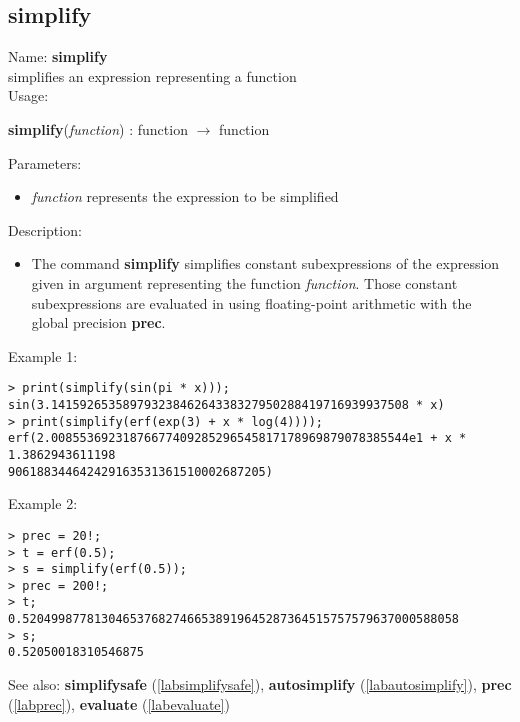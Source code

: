 \subsection{simplify}
\label{labsimplify}
\noindent Name: \textbf{simplify}\\
simplifies an expression representing a function\\
\noindent Usage: 
\begin{center}
\textbf{simplify}(\emph{function}) : \textsf{function} $\rightarrow$ \textsf{function}
\end{center}
Parameters: 
\begin{itemize}
\item \emph{function} represents the expression to be simplified
\end{itemize}
\noindent Description: \begin{itemize}

\item The command \textbf{simplify} simplifies constant subexpressions of the
   expression given in argument representing the function
   \emph{function}. Those constant subexpressions are evaluated in using
   floating-point arithmetic with the global precision \textbf{prec}.
\end{itemize}
\noindent Example 1: 
\begin{center}\begin{minipage}{15cm}\begin{Verbatim}[frame=single]
> print(simplify(sin(pi * x)));
sin(3.14159265358979323846264338327950288419716939937508 * x)
> print(simplify(erf(exp(3) + x * log(4))));
erf(2.00855369231876677409285296545817178969879078385544e1 + x * 1.3862943611198
906188344642429163531361510002687205)
\end{Verbatim}
\end{minipage}\end{center}
\noindent Example 2: 
\begin{center}\begin{minipage}{15cm}\begin{Verbatim}[frame=single]
> prec = 20!;
> t = erf(0.5);
> s = simplify(erf(0.5));
> prec = 200!;
> t;
0.5204998778130465376827466538919645287364515757579637000588058
> s;
0.52050018310546875
\end{Verbatim}
\end{minipage}\end{center}
See also: \textbf{simplifysafe} (\ref{labsimplifysafe}), \textbf{autosimplify} (\ref{labautosimplify}), \textbf{prec} (\ref{labprec}), \textbf{evaluate} (\ref{labevaluate})
